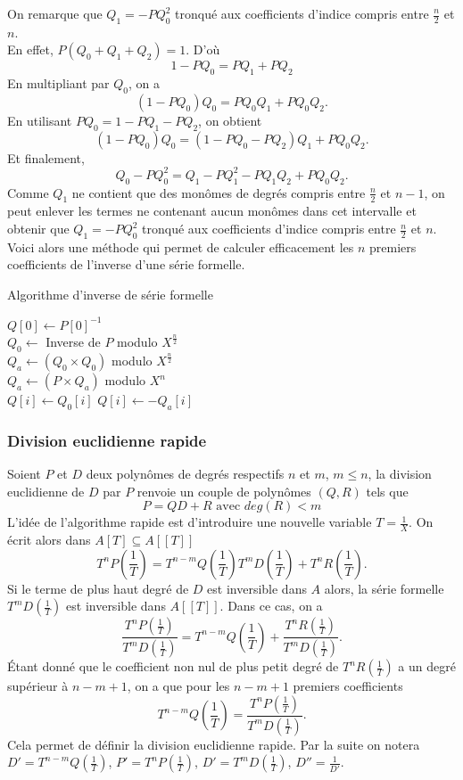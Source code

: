 \documentclass{article}
\theoremstyle{definition}
\theoremstyle{remark}
\begin{document}
On remarque que $Q_1 = -PQ_0^2$ tronqué aux coefficients d'indice compris entre $\frac{n}{2}$ et $n$.\\
En effet, $P(Q_0 + Q_1 + Q_2) = 1$. D'où 
\[1-PQ_0 = PQ_1 + PQ_2\]
En multipliant par $Q_0$, on a 
\[(1-PQ_0)Q_0 = PQ_0Q_1 + PQ_0Q_2.\]
En utilisant $PQ_0 = 1 - PQ_1 - PQ_2$, on obtient
\[(1-PQ_0)Q_0 = (1 - PQ_0 - PQ_2)Q_1 + PQ_0Q_2.\]
Et finalement,
\[Q_0 - PQ_0^2 = Q_1 -PQ_1^2 - PQ_1Q_2 + PQ_0Q_2.\]
Comme $Q_1$ ne contient que des monômes de degrés compris entre $\frac{n}{2}$ et $n-1$, on peut enlever les termes ne contenant aucun monômes dans cet intervalle et obtenir que $Q_1 = -PQ_0^2$ tronqué aux coefficients d'indice compris entre $\frac{n}{2}$ et $n$.
Voici alors une méthode qui permet de calculer efficacement les $n$ premiers coefficients de l'inverse d'une série formelle.

\vspace{0.5cm}

\begin{algorithm}[H]
\label{algo_inv_serie_formelle}
\caption{Algorithme d'inverse de série formelle \cite{inv_formal_series}}
{
    $Q[0] \gets P[0]^{-1}$ \\
}
$Q_0 \gets$ Inverse de $P$ modulo $X^{\frac{n}{2}}$ \\
$Q_a \gets (Q_0 \times Q_0)$ modulo $X^{\frac{n}{2}}$ \\
$Q_a \gets (P \times Q_a)$ modulo $X^n$ \\
{
    $Q[i] \gets Q_0[i]$
}
{
    $Q[i] \gets -Q_a[i]$
}
\end{algorithm}

\vspace{0.5cm}

\subsubsection{Division euclidienne rapide}

Soient $P$ et $D$ deux polynômes de degrés respectifs $n$ et $m$, $m \le n$, la division euclidienne de $D$ par $P$ renvoie un couple de polynômes $(Q, R)$ tels que
\[ P = QD + R \text{ avec } deg(R) < m \]
L'idée de l'algorithme rapide est d'introduire une nouvelle variable $T = \frac{1}{X}$. On écrit alors dans $A[T] \subseteq A[[T]]$
\[ T^n P(\frac{1}{T}) = T^{n-m} Q(\frac{1}{T}) T^m D(\frac{1}{T}) + T^n R(\frac{1}{T}).\]
Si le terme de plus haut degré de $D$ est inversible dans $A$ alors, la série formelle $T^m D(\frac{1}{T})$ est inversible dans $A[[T]]$. Dans ce cas, on a
\[ \frac{T^n P(\frac{1}{T})}{T^m D(\frac{1}{T})} = T^{n-m} Q(\frac{1}{T}) + \frac{T^n R(\frac{1}{T})}{T^m D(\frac{1}{T})}. \]
Étant donné que le coefficient non nul de plus petit degré de $T^n R(\frac{1}{T})$ a un degré supérieur à $n-m+1$, on a que pour les $n-m+1$ premiers coefficients
\[ T^{n-m}Q(\frac{1}{T}) = \frac{T^n P(\frac{1}{T})}{T^m D(\frac{1}{T})}. \]
Cela permet de définir la division euclidienne rapide. Par la suite on notera $D' = T^{n-m}Q(\frac{1}{T})$, $P' = T^n P(\frac{1}{T})$, $D' = T^m D(\frac{1}{T})$, $D'' = \frac{1}{D'}$.
\end{document}
